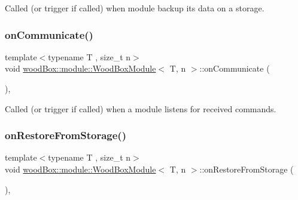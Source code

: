 Called (or trigger if called) when module backup its data on a storage. \mbox{\label{classwood_box_1_1module_1_1_wood_box_module_acacb4ac748c70bd1f172d9a87e07dfbf}} 
\subsubsection{\texorpdfstring{on\+Communicate()}{onCommunicate()}}
{\footnotesize\ttfamily template$<$typename T , size\+\_\+t n$>$ \\
void \mbox{\hyperlink{classwood_box_1_1module_1_1_wood_box_module}{wood\+Box\+::module\+::\+Wood\+Box\+Module}}$<$ T, n $>$\+::on\+Communicate (\begin{DoxyParamCaption}{ }\end{DoxyParamCaption})\hspace{0.3cm}{\ttfamily [inline]}, {\ttfamily [protected]}}

Called (or trigger if called) when a module listens for received commands. \mbox{\label{classwood_box_1_1module_1_1_wood_box_module_a89395caa73cadc63c576931b45400c2d}} 
\subsubsection{\texorpdfstring{on\+Restore\+From\+Storage()}{onRestoreFromStorage()}}
{\footnotesize\ttfamily template$<$typename T , size\+\_\+t n$>$ \\
void \mbox{\hyperlink{classwood_box_1_1module_1_1_wood_box_module}{wood\+Box\+::module\+::\+Wood\+Box\+Module}}$<$ T, n $>$\+::on\+Restore\+From\+Storage (\begin{DoxyParamCaption}{ }\end{DoxyParamCaption})\hspace{0.3cm}{\ttfamily [inline]}, {\ttfamily [protected]}}


